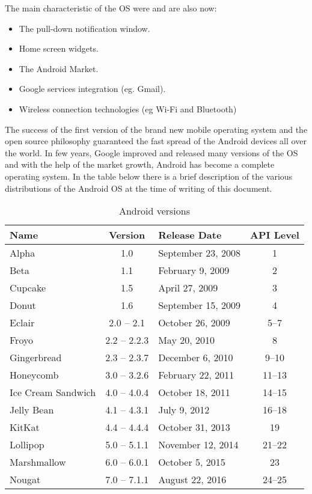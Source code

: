 The main characteristic of the OS were and are also now:
\begin{itemize}
	\item The pull-down notification window.
	\item Home screen widgets.
	\item The Android Market.
	\item Google services integration (eg. Gmail).
	\item Wireless connection technologies (eg Wi-Fi and Bluetooth)
\end{itemize}
The success of the first version of the brand new mobile operating system and the open source philosophy guaranteed the fast spread of the Android devices all over the world. In few years, Google improved and released many versions of the OS and with the help of the market growth, Android has become a complete operating system. 
In the table below there is a brief description of the various distributions of the Android OS at the time of writing of this document.\\
\begin{table}[h]
	\caption{Android versions}
	\label{tab:vers}
	\centering
	\begin{tabular}{lclc}
		\toprule
		\textbf{Name} & \textbf{Version}  & \textbf{Release Date} & \textbf{API Level}\\
		\midrule
		Alpha &	1.0 & September 23, 2008 & 1 \\
		Beta & 1.1 & February 9, 2009 & 2 \\
		Cupcake & 1.5 & April 27, 2009 & 3 \\
		Donut &	1.6 & September 15, 2009 & 4 \\
		Eclair & 2.0 – 2.1 & October 26, 2009 & 5–7 \\
		Froyo & 2.2 – 2.2.3 & May 20, 2010 & 8 \\
		Gingerbread & 2.3 – 2.3.7 & December 6, 2010 & 9–10 \\	
		Honeycomb & 3.0 – 3.2.6 & February 22, 2011 & 11–13 \\
		Ice Cream Sandwich & 4.0 – 4.0.4 & October 18, 2011 & 14–15 \\
		Jelly Bean & 4.1 – 4.3.1 & July 9, 2012 & 16–18 \\
		KitKat & 4.4 – 4.4.4 & October 31, 2013 & 19 \\
		Lollipop & 5.0 – 5.1.1 & November 12, 2014 & 21–22 \\
		Marshmallow & 6.0 – 6.0.1 & October 5, 2015 & 23 \\
		Nougat & 7.0 – 7.1.1 & August 22, 2016 & 24–25 \\
		\bottomrule
	\end{tabular}
\end{table}
